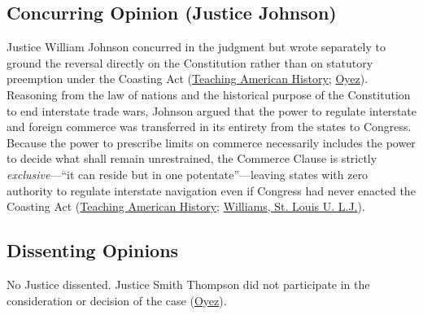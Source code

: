 \documentclass[12pt]{article}
\begin{document}
\subsection{Concurring Opinion (Justice Johnson)}
Justice William Johnson concurred in the judgment but wrote separately to ground the reversal directly on the Constitution rather than on statutory preemption under the Coasting Act (\href{https://teachingamericanhistory.org/document/gibbons-v-ogden/}{Teaching American History}; \href{https://www.oyez.org/cases/1789-1850/22us1}{Oyez}). Reasoning from the law of nations and the historical purpose of the Constitution to end interstate trade wars, Johnson argued that the power to regulate interstate and foreign commerce was transferred in its entirety from the states to Congress. Because the power to prescribe limits on commerce necessarily includes the power to decide what shall remain unrestrained, the Commerce Clause is strictly \emph{exclusive}---``it can reside but in one potentate''---leaving states with zero authority to regulate interstate navigation even if Congress had never enacted the Coasting Act (\href{https://teachingamericanhistory.org/document/gibbons-v-ogden/}{Teaching American History}; \href{https://scholarship.law.slu.edu/cgi/viewcontent.cgi?article=1753&context=lj}{Williams, St. Louis U. L.J.}).

\subsection{Dissenting Opinions}
No Justice dissented. Justice Smith Thompson did not participate in the consideration or decision of the case (\href{https://www.oyez.org/cases/1789-1850/22us1}{Oyez}).
\end{document}
